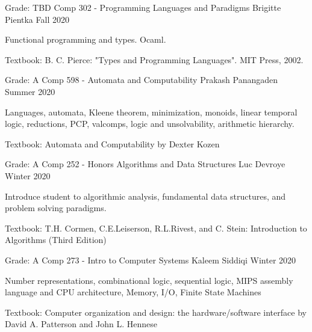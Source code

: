 \begin{cventries}
  \cventry
    {Grade: TBD} %
    {Comp 302 - Programming Languages and Paradigms} %
    {Brigitte Pientka } %
    {Fall 2020} %
    {
      \begin{cvitems} %
      \item {Functional programming and types. Ocaml.}
      \item {Textbook: B. C. Pierce: "Types and Programming Languages". MIT Press, 2002.}
      \end{cvitems}
    }

  \cventry
    {Grade: A} %
    {Comp 598 - Automata and Computability} %
    {Prakash Panangaden} %
    {Summer 2020} %
    {
      \begin{cvitems} %
      \item {Languages, automata, Kleene theorem, minimization, monoids, linear temporal logic, reductions, PCP, valcomps, logic and unsolvability, arithmetic hierarchy.}
      \item {Textbook: Automata and Computability by Dexter Kozen}
      \end{cvitems}
    }

  \cventry
    {Grade: A} %
    {Comp 252 - Honors Algorithms and Data Structures} %
    {Luc Devroye} %
    {Winter 2020} %
    {
      \begin{cvitems} %
      \item {Introduce student to algorithmic analysis, fundamental data structures, and problem solving paradigms.}
      \item {Textbook: T.H. Cormen, C.E.Leiserson, R.L.Rivest, and C. Stein: Introduction to Algorithms (Third Edition)}
      \end{cvitems}
    }

    \cventry
    {Grade: A} %
    {Comp 273 - Intro to Computer Systems} %
    {Kaleem Siddiqi} %
    {Winter 2020} %
    {
      \begin{cvitems} %
      \item {Number representations, combinational logic, sequential logic, MIPS assembly language and CPU architecture, Memory, I/O, Finite State Machines}
      \item {Textbook: Computer organization and design: the hardware/software interface by David A. Patterson and John L. Hennese}
      \end{cvitems}
    }


\end{cventries}
